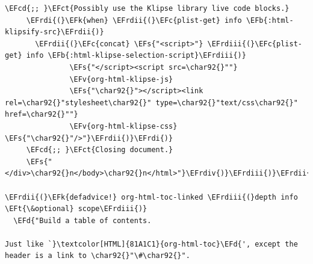 \documentclass{scrartcl}
\newcommand{\EFk}[1]{\textcolor{EFk}{#1}} %
\newcommand{\EFd}[1]{\textcolor{EFd}{#1}} %
\newcommand{\EFt}[1]{\textcolor{EFt}{#1}} %
\newcommand{\EFs}[1]{\textcolor{EFs}{#1}} %
\newcommand{\EFb}[1]{\textcolor{EFb}{#1}} %
\newcommand{\EFct}[1]{\textcolor{EFct}{#1}} %
\newcommand{\EFc}[1]{\textcolor{EFc}{#1}} %
\newcommand{\EFv}[1]{\textcolor{EFv}{#1}} %
\newcommand{\EFcd}[1]{\textcolor{EFcd}{#1}} %
\newcommand{\EFrdi}[1]{#1} %
\newcommand{\EFrdii}[1]{#1} %
\newcommand{\EFrdiii}[1]{#1} %
\newcommand{\EFrdiv}[1]{#1} %
\begin{document}
\begin{Code}
\begin{Verbatim}[]
     \EFcd{;; }\EFct{Possibly use the Klipse library live code blocks.}
     \EFrdi{(}\EFk{when} \EFrdii{(}\EFc{plist-get} info \EFb{:html-klipsify-src}\EFrdii{)}
       \EFrdii{(}\EFc{concat} \EFs{"<script>"} \EFrdiii{(}\EFc{plist-get} info \EFb{:html-klipse-selection-script}\EFrdiii{)}
               \EFs{"</script><script src=\char92{}""}
               \EFv{org-html-klipse-js}
               \EFs{"\char92{}"></script><link rel=\char92{}"stylesheet\char92{}" type=\char92{}"text/css\char92{}" href=\char92{}""}
               \EFv{org-html-klipse-css} \EFs{"\char92{}"/>"}\EFrdii{)}\EFrdi{)}
     \EFcd{;; }\EFct{Closing document.}
     \EFs{"</div>\char92{}n</body>\char92{}n</html>"}\EFrdiv{)}\EFrdiii{)}\EFrdii{)}

\EFrdii{(}\EFk{defadvice!} org-html-toc-linked \EFrdiii{(}depth info \EFt{\&optional} scope\EFrdiii{)}
  \EFd{"Build a table of contents.

Just like `}\textcolor[HTML]{81A1C1}{org-html-toc}\EFd{', except the header is a link to \char92{}"\#\char92{}".


\end{Verbatim}
\end{Code}
\end{document}
